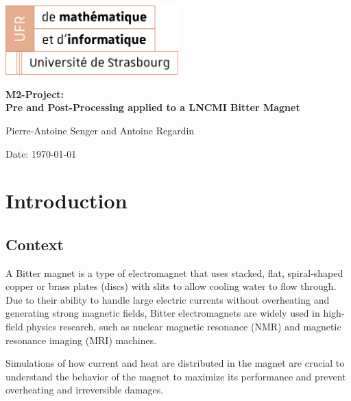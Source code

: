 \documentclass[12pt]{article}
\begin{document}
\begin{titlepage}
  \centering
  \includegraphics[width=0.5\textwidth]{images/logo-ufr.png}\par\vspace{1cm}
  \vspace{1.5cm}
  {\huge\bfseries M2-Project: \\
  Pre and Post-Processing applied to a LNCMI Bitter Magnet\par}
  \vspace{2cm}
  {\Large Pierre-Antoine Senger and Antoine Regardin\par}
  \vfill

  \vfill

  {\large Date: \today\par}
\end{titlepage}

\tableofcontents

\newpage

\section{Introduction}

\subsection{Context}
A Bitter magnet is a type of electromagnet that uses stacked, flat, spiral-shaped
copper or brass plates (discs) with slits to allow cooling water to flow through.
Due to their ability to handle large electric currents without overheating and
generating strong magnetic fields, Bitter electromagnets are widely used in
high-field physics research, such as nuclear magnetic resonance (NMR) and magnetic
resonance imaging (MRI) machines.

Simulations of how current and heat are distributed in the magnet are crucial to
understand the behavior of the magnet to maximize its performance and prevent
overheating and irreversible damages.
\end{document}
